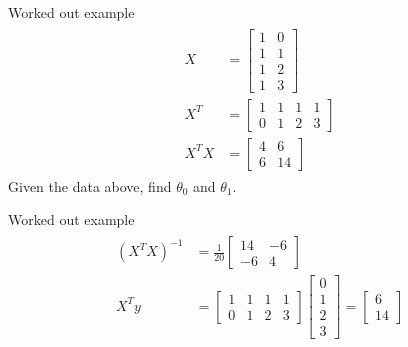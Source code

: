 \documentclass{beamer}
\begin{document}
\begin{frame}{Worked out example}
\begin{align}
    \begin{split}
        X &= \begin{bmatrix}
            1 & 0\\
            1 & 1\\
            1 & 2\\
            1 & 3
        \end{bmatrix}\\
        X^{T} &= \begin{bmatrix}
            1&1&1&1\\
            0&1&2&3
        \end{bmatrix}\\
        X^{T}X &= \begin{bmatrix}
            4 &6\\6&14
        \end{bmatrix}
    \end{split}
\end{align}
Given the data above, find $\theta_{0}$ and $\theta_{1}$.
\end{frame}


\begin{frame}{Worked out example}
    \begin{align}
        \begin{split}
            (X^{T}X)^{-1} &= \frac{1}{20} \begin{bmatrix}
                14 & -6\\
                -6& 4
            \end{bmatrix}\\
            X^{T}y &= \begin{bmatrix}
            1&1&1&1\\
            0&1&2&3
            \end{bmatrix}\begin{bmatrix}
            0\\1\\2\\3
            \end{bmatrix}=\begin{bmatrix}
                6\\
                14
            \end{bmatrix}
        \end{split}
    \end{align}
\end{frame}
\end{document}
